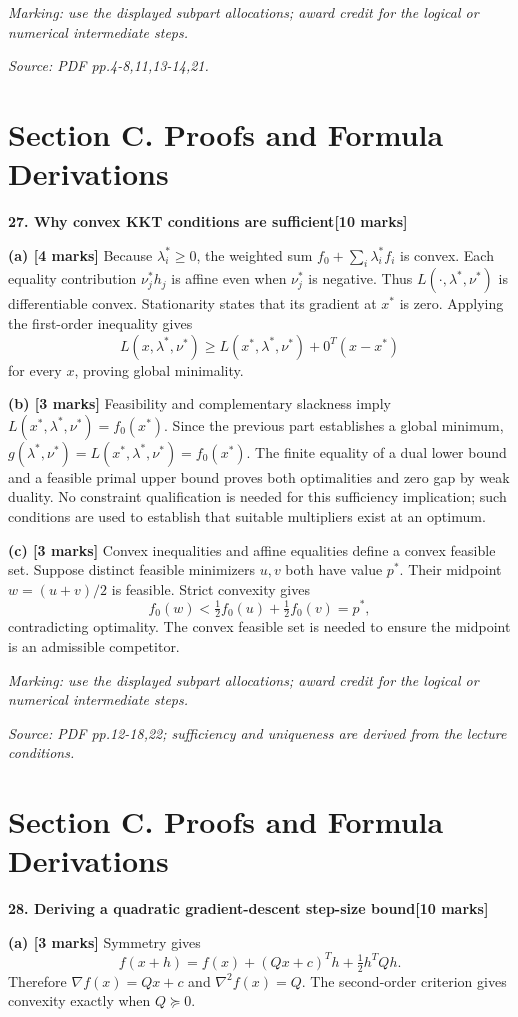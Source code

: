 \documentclass[11pt,a4paper]{article}
\begin{document}
\textit{Marking: use the displayed subpart allocations; award credit for the logical or numerical intermediate steps.}\par
{\footnotesize\textit{Source: PDF pp.4-8,11,13-14,21.}}
\newpage\section*{Section C. Proofs and Formula Derivations}
\textbf{27. Why convex KKT conditions are sufficient}\hfill\textbf{[10 marks]}\par\medskip
\textbf{(a) [4 marks]} Because \(\lambda_i^*\ge0\), the weighted sum \(f_0+\sum_i\lambda_i^*f_i\) is convex. Each equality contribution \(\nu_j^*h_j\) is affine even when \(\nu_j^*\) is negative. Thus \(L(\cdot,\lambda^*,\nu^*)\) is differentiable convex. Stationarity states that its gradient at \(x^*\) is zero. Applying the first-order inequality gives \[L(x,\lambda^*,\nu^*)\ge L(x^*,\lambda^*,\nu^*)+0^T(x-x^*)\] for every \(x\), proving global minimality.

\textbf{(b) [3 marks]} Feasibility and complementary slackness imply \(L(x^*,\lambda^*,\nu^*)=f_0(x^*)\). Since the previous part establishes a global minimum, \(g(\lambda^*,\nu^*)=L(x^*,\lambda^*,\nu^*)=f_0(x^*)\). The finite equality of a dual lower bound and a feasible primal upper bound proves both optimalities and zero gap by weak duality. No constraint qualification is needed for this sufficiency implication; such conditions are used to establish that suitable multipliers exist at an optimum.

\textbf{(c) [3 marks]} Convex inequalities and affine equalities define a convex feasible set. Suppose distinct feasible minimizers \(u,v\) both have value \(p^*\). Their midpoint \(w=(u+v)/2\) is feasible. Strict convexity gives \[f_0(w)<\tfrac12f_0(u)+\tfrac12f_0(v)=p^*,\] contradicting optimality. The convex feasible set is needed to ensure the midpoint is an admissible competitor.

\textit{Marking: use the displayed subpart allocations; award credit for the logical or numerical intermediate steps.}\par
{\footnotesize\textit{Source: PDF pp.12-18,22; sufficiency and uniqueness are derived from the lecture conditions.}}
\newpage\section*{Section C. Proofs and Formula Derivations}
\textbf{28. Deriving a quadratic gradient-descent step-size bound}\hfill\textbf{[10 marks]}\par\medskip
\textbf{(a) [3 marks]} Symmetry gives \[f(x+h)=f(x)+(Qx+c)^Th+\tfrac12h^TQh.\] Therefore \(\nabla f(x)=Qx+c\) and \(\nabla^2f(x)=Q\). The second-order criterion gives convexity exactly when \(Q\succeq0\).
\end{document}
